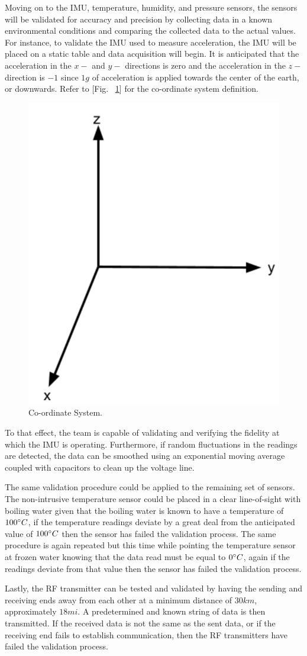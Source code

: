 Moving on to the IMU, temperature, humidity, and pressure sensors, the sensors will be validated for accuracy and precision by collecting data in a known environmental conditions and comparing the collected data to the actual values. For instance, to validate the IMU used to measure acceleration, the IMU will be placed on a static table and data acquisition will begin. It is anticipated that the acceleration in the $x-$ and $y-$ directions is zero and the acceleration in the $z-$ direction is $-1$ since $1g$ of acceleration is applied towards the center of the earth, or downwards. Refer to [Fig. ~\ref{fig:coordinate_system}] for the co-ordinate system definition.

\begin{figure}[H]
  \centering
  \includegraphics[width=.3\textwidth]{Controls/coordinate_system.png}
  \caption{\label{fig:coordinate_system} Co-ordinate System.}
\end{figure}

To that effect, the team is capable of validating and verifying the fidelity at which the IMU is operating. Furthermore, if random fluctuations in the readings are detected, the data can be smoothed using an exponential moving average coupled with capacitors to clean up the voltage line.

The same validation procedure could be applied to the remaining set of sensors. The non-intrusive temperature sensor could be placed in a clear line-of-sight with boiling water given that the boiling water is known to have a temperature of $100\degree C$, if the temperature readings deviate by a great deal from the anticipated value of $100\degree C$ then the sensor has failed the validation process. The same procedure is again repeated but this time while pointing the temperature sensor at frozen water knowing that the data read must be equal to $0\degree C$, again if the readings deviate from that value then the sensor has failed the validation process.

Lastly, the RF transmitter can be tested and validated by having the sending and receiving ends away from each other at a minimum distance of $30km$, approximately $18mi$. A predetermined and known string of data is then transmitted. If the received data is not the same as the sent data, or if the receiving end fails to establish communication, then the RF transmitters have failed the validation process.

